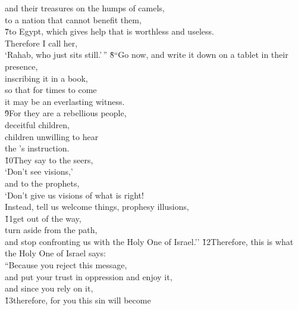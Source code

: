 \begin{poetry}
\poeml and their treasures on the humps of camels, \\
\poemll    to a nation that cannot benefit them, \\
\poeml \v{7}to Egypt, which gives help that is worthless and useless. \\
\poemll    Therefore I call her, \\
\poemlll       `Rahab, who just sits still.'\,''
\poeml \v{8}``Go now, and write it down on a tablet in their presence, \\
\poemll    inscribing it in a book, \\
\poeml so that for times to come \\
\poemll    it may be an everlasting witness. \\
\poeml \v{9}For they are a rebellious people, \\
\poemll    deceitful children, \\
\poeml children unwilling to hear \\
\poemll    the 's instruction. \\
\poeml \v{10}They say to the seers, \\
\poemll    `Don't see visions,' \\
\poeml and to the prophets, \\
\poemll    `Don't give us visions of what is right! \\
\poemlll       Instead, tell us welcome things, prophesy illusions, \\
\poeml \v{11}get out of the way, \\
\poemll    turn aside from the path, \\
\poemlll       and stop confronting us with the Holy One of Israel.''
\poeml \v{12}Therefore, this is what the Holy One of Israel says: \\
\poeml ``Because you reject this message, \\
\poemll    and put your trust in oppression and enjoy it, \\
\poemlll       and since you rely on it, \\
\poeml \v{13}therefore, for you this sin will become \\

\end{poetry}
